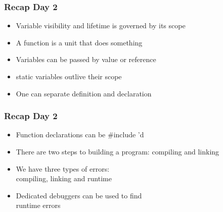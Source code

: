 \documentclass[14pt,a4paper,dvipsnames,usenames]{beamer}
\begin{document}
\frame[plain]{\sectionpage}

\begin{frame}
  \frametitle{Recap Day 2}

  \begin{itemize}
    \setlength\itemsep{0.75em}
    \item Variable visibility and lifetime is governed by its scope
    \item A function is a unit that {\color{FeebleWeek}does something}
    \item Variables can be passed by value or reference
    \item {\color{FeebleWeek}static} variables outlive their scope
    \item One can separate definition and declaration
  \end{itemize}
  
\end{frame}

\begin{frame}
  \frametitle{Recap Day 2}

  \begin{itemize}
    \setlength\itemsep{0.75em}
    \item Function declarations can be {\color{sorange}\#include} 'd
    \item There are two steps to building a program: {\color{Tropiteal}compiling} and {\color{FeebleWeek}linking}
    \item We have three types of errors:\\{\color{Marty}compiling}, {\color{Marty}linking} and {\color{Marty}runtime}
    \item Dedicated debuggers can be used to find\\runtime errors
  \end{itemize}
  
\end{frame}
\end{document}
